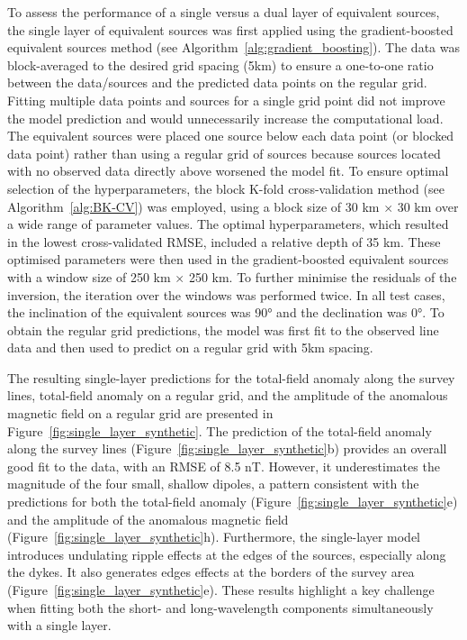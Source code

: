 To assess the performance of a single versus a dual layer of equivalent sources, the single layer of equivalent sources was first applied using the gradient-boosted equivalent sources method (see Algorithm~\ref{alg:gradient_boosting}). The data was block-averaged to the desired grid spacing (5km) to ensure a one-to-one ratio between the data/sources and the predicted data points on the regular grid. Fitting multiple data points and sources for a single grid point did not improve the model prediction and would unnecessarily increase the computational load. The equivalent sources were placed one source below each data point (or blocked data point) rather than using a regular grid of sources because sources located with no observed data directly above worsened the model fit. To ensure optimal selection of the hyperparameters, the block K-fold cross-validation method (see Algorithm~\ref{alg:BK-CV}) was employed, using a block size of 30 km $\times$ 30 km over a wide range of parameter values. The optimal hyperparameters, which resulted in the lowest cross-validated RMSE, included a relative depth of 35 km. These optimised parameters were then used in the gradient-boosted equivalent sources with a window size of 250 km $\times$ 250 km. To further minimise the residuals of the inversion, the iteration over the windows was performed twice. In all test cases, the inclination of the equivalent sources was \ang{90} and the declination was \ang{0}. To obtain the regular grid predictions, the model was first fit to the observed line data and then used to predict on a regular grid with 5km spacing.

The resulting single-layer predictions for the total-field anomaly along the survey lines, total-field anomaly on a regular grid, and the amplitude of the anomalous magnetic field on a regular grid are presented in Figure~\ref{fig:single_layer_synthetic}. The prediction of the total-field anomaly along the survey lines (Figure~\ref{fig:single_layer_synthetic}b) provides an overall good fit to the data, with an RMSE of 8.5 nT. However, it underestimates the magnitude of the four small, shallow dipoles, a pattern consistent with the predictions for both the total-field anomaly (Figure~\ref{fig:single_layer_synthetic}e) and the amplitude of the anomalous magnetic field (Figure~\ref{fig:single_layer_synthetic}h). Furthermore, the single-layer model introduces undulating ripple effects at the edges of the sources, especially along the dykes. It also generates edges effects at the borders of the survey area (Figure~\ref{fig:single_layer_synthetic}e). These results highlight a key challenge when fitting both the short- and long-wavelength components simultaneously with a single layer.

